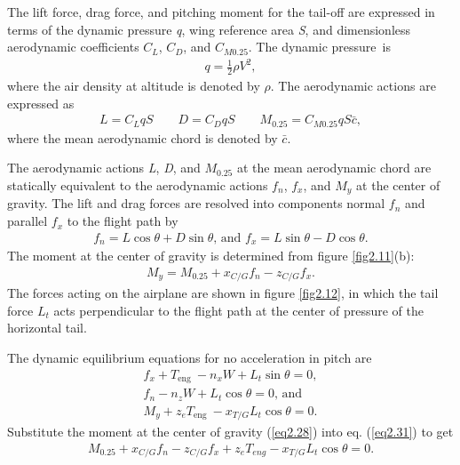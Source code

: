 \documentclass{AeroStructure-ERJohnson}
\begin{document}
The lift force, drag force, and pitching moment for the tail-off are expressed in terms of the dynamic pressure \textit{q}, wing reference area \textit{S}, and dimensionless aerodynamic coefficients $C_{L}$, $C_{D}$, and $C_{M 0.25}$. The dynamic pressure~is
\begin{align}\label{eq2.25}
q=\frac{1}{2} \rho V^{2},
\end{align}
where the air density at altitude is denoted by $\rho$. The aerodynamic actions are expressed as
\begin{align}\label{eq2.26}
L=C_{L} q S \qquad D=C_{D} q S \qquad M_{0.25}=C_{M 0.25} q S \bar{c},
\end{align}
where the mean aerodynamic chord is denoted by $\bar{c}$.

The aerodynamic actions \textit{L}, \textit{D}, and $M_{0.25}$ at the mean aerodynamic chord are statically equivalent to the aerodynamic actions $f_{n}$, $f_{x}$, and $M_{y}$ at the center of gravity. The lift and drag forces are resolved into components normal $f_{n}$ and parallel $f_{x}$ to the flight path by
\begin{align}\label{eq2.27}
f_{n}=L \cos \theta+D \sin \theta\mbox{, and }f_{x}=L \sin \theta-D \cos \theta.
\end{align}
The moment at the center of gravity is determined from figure \ref{fig2.11}(b):
\begin{align}\label{eq2.28}
M_{y}=M_{0.25}+x_{C/G} f_{n}-z_{C/G} f_{x}.
\end{align}
The forces acting on the airplane are shown in figure \ref{fig2.12}, in which the tail force $L_{t}$ acts perpendicular to the flight path at the center of pressure of the horizontal tail.


{\def\thefigure{2.12}
}


The dynamic equilibrium equations for no acceleration in pitch are
\begin{align}
f_{x}+T_{\text {eng }}-n_{x} W+L_{t} \sin \theta=0,\label{eq2.29}\\
f_{n}-n_{z} W+L_{t} \cos \theta=0\mbox{, and}\label{eq2.30}\\
M_{y}+z_{e} T_{\text {eng }}-x_{T/G} L_{t} \cos \theta=0.\label{eq2.31}
\end{align}
Substitute the moment at the center of gravity (\ref{eq2.28}) into eq. (\ref{eq2.31}) to get
\begin{align}\label{eq2.32}
M_{0.25}+x_{C/G} f_{n}-z_{C/G} f_{x}+z_{e} T_{e n g}-x_{T/G} L_{t} \cos \theta=0.
\end{align}
\end{document}
